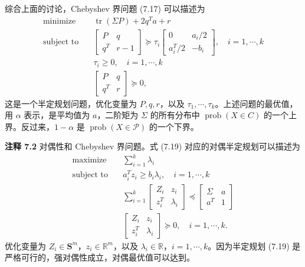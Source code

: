 \documentclass[UTF8, 12pt, fontset=fandol, oneside]{ctexart}
\begin{document}
综合上面的讨论，Chebyshev 界问题 (7.17) 可以描述为
\begin{equation}
\begin{aligned}
\text{minimize}\quad & \operatorname{tr}(\Sigma P)+2q^Ta+r\\
\text{subject to}\quad &
\begin{bmatrix}
P & q\\
q^T & r-1
\end{bmatrix}\succeq
\tau_i
\begin{bmatrix}
0 & a_i/2\\
a_i^T/2 & -b_i
\end{bmatrix},
\quad i=1,\cdots,k\\
& \tau_i\geq 0,\quad i=1,\cdots,k\\
&
\begin{bmatrix}
P & q\\
q^T & r
\end{bmatrix}\succeq 0,
\end{aligned}
\tag{7.19}
\end{equation}
这是一个半定规划问题，优化变量为 $P,q,r$，以及 $\tau_1,\cdots,\tau_k$。上述问题的最优值，用 $\alpha$ 表示，是平均值为 $a$，二阶矩为 $\Sigma$ 的所有分布中 $\operatorname{prob}(X\in C)$ 的一个上界。反过来，$1-\alpha$ 是 $\operatorname{prob}(X\in\mathcal{P})$ 的一个下界。

\noindent\textbf{注释 7.2}\quad
对偶性和 Chebyshev 界问题。式 (7.19) 对应的对偶半定规划可以描述为
\[
\begin{aligned}
\text{maximize}\quad & \sum_{i=1}^k \lambda_i\\
\text{subject to}\quad & a_i^Tz_i\geq b_i\lambda_i,\quad i=1,\cdots,k\\
& \sum_{i=1}^k
\begin{bmatrix}
Z_i & z_i\\
z_i^T & \lambda_i
\end{bmatrix}
\preceq
\begin{bmatrix}
\Sigma & a\\
a^T & 1
\end{bmatrix}\\
&
\begin{bmatrix}
Z_i & z_i\\
z_i^T & \lambda_i
\end{bmatrix}\succeq 0,\quad i=1,\cdots,k.
\end{aligned}
\]
优化变量为 $Z_i\in\mathbf{S}^m$，$z_i\in\mathbb{R}^m$，以及 $\lambda_i\in\mathbb{R}$，$i=1,\cdots,k$。因为半定规划 (7.19) 是严格可行的，强对偶性成立，对偶最优值可以达到。
\end{document}
